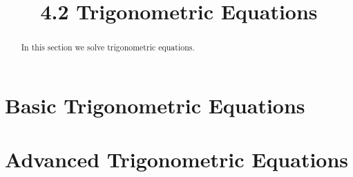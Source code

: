 \documentclass[handout]{ximera}
\title{4.2 Trigonometric Equations}
\begin{document}
\begin{abstract}
In this section we solve trigonometric equations.
\end{abstract}

\maketitle


\section{Basic Trigonometric Equations}




\section{Advanced Trigonometric Equations}
\end{document}
